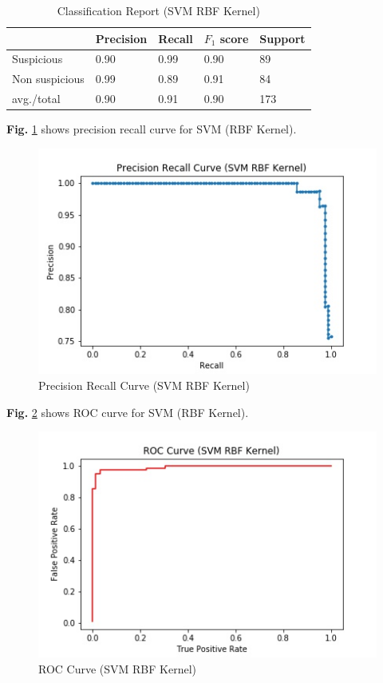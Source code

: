 \documentclass[12pt,a4paper]{report}
\begin{document}
\begin{table}[h!]
\begin{center}
\caption{Classification Report (SVM RBF Kernel)}
\begin{tabular}{|m{4.4cm} | m{2cm}| m{2cm}| m{2cm}| m{2cm}|}
\hline
     & Precision & Recall & $F_1$ score & Support \\
\hline
     Suspicious & 0.90 & 0.99 & 0.90 & 89\\
\hline 
     Non suspicious  & 0.99 & 0.89 & 0.91 & 84\\
\hline 
     avg./total & 0.90 & 0.91 & 0.90 & 173\\
\hline
\end{tabular}
\end{center}
\end{table}

\noindent
\textbf{Fig.} \ref{fig:prsk} shows precision recall curve for SVM (RBF Kernel).

\begin{figure}[h!]
    \centering
    \includegraphics[scale=0.58]{Figures/PRSK.jpg}
    \caption{Precision Recall Curve (SVM RBF Kernel)}
    \label{fig:prsk}
\end{figure}

\noindent
\textbf{Fig.} \ref{fig:rocsk} shows ROC curve for SVM (RBF Kernel).

\begin{figure}[h!]
    \centering
    \includegraphics[scale=0.58]{Figures/ROCSK.jpg}
    \caption{ROC Curve (SVM RBF Kernel)}
    \label{fig:rocsk}
\end{figure}
\end{document}
